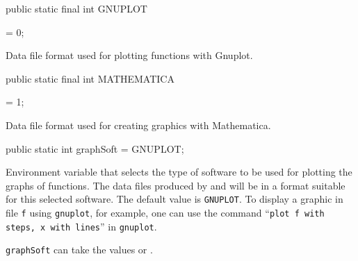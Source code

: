 \begin{code}

   public static final int GNUPLOT\begin{hide} = 0; \end{hide}
\end{code}
 \begin{tabb}  Data file format used for plotting functions with Gnuplot.
 \end{tabb}
\begin{code}

   public static final int MATHEMATICA\begin{hide} = 1; \end{hide}
\end{code}
 \begin{tabb}  Data file format used for creating graphics with Mathematica.
 \end{tabb}
\begin{code}

   public static int graphSoft = GNUPLOT;
\end{code}
 \begin{tabb} Environment variable that selects the type of software to be
   used for plotting the graphs of functions.
   The data files produced by  and
    will be in a format suitable
   for this selected software.
   The default value is \texttt{GNUPLOT}.
   To display a graphic in file \texttt{f} using \texttt{gnuplot}, for example,
   one can use the command ``\texttt{plot f with steps, x with lines}''
   in \texttt{gnuplot}.
\begin{htmlonly}
  \texttt{graphSoft} can take the values  or .
\end{htmlonly}
 \end{tabb}
